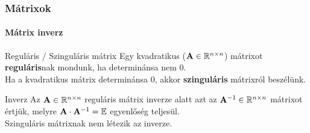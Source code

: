 \begin{frame}
  \frametitle{Mátrixok}
  \framesubtitle{Mátrix inverz}

  \vfill

  \begin{block}{Reguláris / Szinguláris mátrix}
    Egy kvadratikus ($\mathbf{A} \in \mathbb R^{n \times n}$) mátrixot
    \textbf{reguláris}nak mondunk, ha determinánsa nem 0.
    \\[3mm]
    Ha a kvadratikus mátrix determinánsa 0, akkor \textbf{szinguláris} mátrixról
    beszélünk.
  \end{block}

  \vfill

  \begin{block}{Inverz}
    Az $\mathbf{A} \in \mathbb R^{n \times n}$ reguláris mátrix inverze alatt azt
    az $\mathbf{A}^{-1} \in \mathbb R^{n \times n}$ mátrixot értjük, melyre
    $\mathbf{A} \cdot \mathbf{A}^{-1} = {\mathbb{E}}$ egyenlőség teljesül.
    \\[3mm]
    Szinguláris mátrixnak nem létezik az inverze.
  \end{block}

  \vfill
\end{frame}

